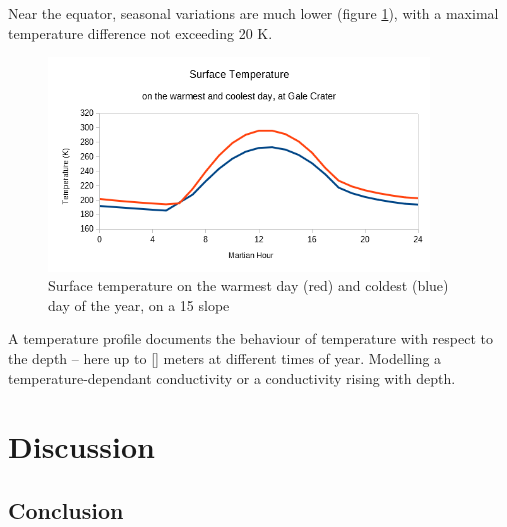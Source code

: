 \documentclass{report}
\begin{document}
Near the equator, seasonal variations are much lower (figure \ref{hourlygale}), with a maximal temperature difference not exceeding 20 K. \\
\begin{figure}
    \centering
    \includegraphics[width=0.9\textwidth]{graphs/0108-gale-hourly.png}
    \caption{Surface temperature on the warmest day (red) and coldest (blue) day of the year, on a 15 \degree slope}
    \label{hourlygale}
\end{figure}{}

A temperature profile documents the behaviour of temperature with respect to the depth -- here up to [] meters at different times of year. 
Modelling a temperature-dependant conductivity or a conductivity rising with depth. \\

\chapter{Discussion}

\section*{Conclusion}

\printbibliography 
\end{document}
